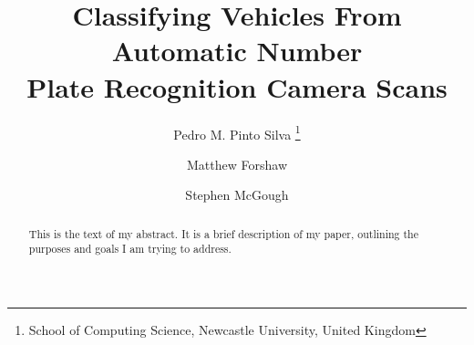 \documentclass[twoside,leqno,twocolumn]{article}
\begin{document}

\title{\Large Classifying Vehicles From Automatic Number \\ Plate Recognition Camera Scans}
\author{Pedro M. Pinto Silva \thanks{School of Computing Science, Newcastle University, United Kingdom}
\and
Matthew Forshaw\footnotemark[1]
\and
Stephen McGough\footnotemark[1]}
\date{}

\maketitle








\begin{abstract} \small\baselineskip=9pt This is the text of my abstract. It is a brief
description of my
paper, outlining the purposes and goals I am trying to address.\end{abstract}







\end{document}
